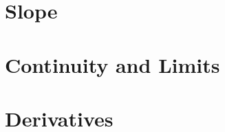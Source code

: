\section{Slope}

\newpage

\newpage
\section{Continuity and Limits}

\newpage

\newpage


\newpage
\section{Derivatives}

\newpage
